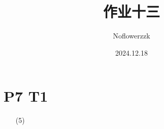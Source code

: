 \documentclass{article}
\title{作业十三}
\author{Noflowerzzk}
\date{2024.12.18}
\begin{document}
\maketitle

\section*{P7 T1}

\begin{itemize}
    \item [(5)]
\end{itemize}
\end{document}
